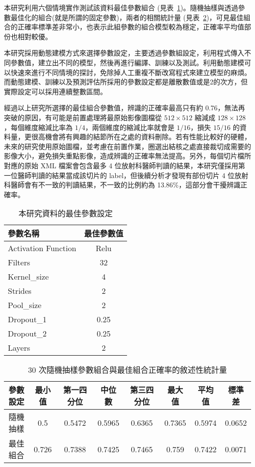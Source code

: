 \documentclass[12pt, a4paper]{article} 				%
\begin{document}
本研究利用六個情境實作測試該資料最佳參數組合 (見表~\ref{Table5-3})。隨機抽樣與透過參數最佳化的組合(就是所謂的固定參數)，兩者的相關統計量 (見表~\ref{Table5-4})，可見最佳組合的正確率標準差非常小，也表示此組參數的組合模型較為穩定，正確率平均值部份也相對較優。

本研究採用動態建模方式來選擇參數設定，主要透過參數組設定，利用程式傳入不同參數值，建立出不同的模型，然後再進行編譯、訓練以及測試。利用動態建模可以快速來進行不同情境的探討，免除掉人工重複不斷改寫程式來建立模型的麻煩。而動態建模、訓練以及預測評估所採用的參數設定都是離散數值或是2的次方，但實際設定可以採用連續整數區間。

經過以上研究所選擇的最佳組合參數值，辨識的正確率最高只有約 0.76，無法再突破的原因，有可能是前置處理將最原始影像圖檔從 $512\times 512$ 縮減成 $128\times 128$，每個維度縮減比率為 $1/4$，兩個維度的縮減比率就會是 $1/16$，損失 $15/16$ 的資料量，更很高機會將有興趣的結節所在之處的資料刪除。若有性能比較好的硬體，未來的研究使用原始圖檔，並考慮在前置作業，圈選出結核之處直接裁切成需要的影像大小，避免損失重點影像，造成辨識的正確率無法提高。另外，每個切片檔所對應的原始 XML 檔案會包含最多 4 位放射科醫師判讀的結果，本研究僅採用第一位醫師判讀的結果當成該切片的 label，但後續分析才發現有部份切片 4 位放射科醫師會有不一致的判讀結果，不一致的比例約為 13.86\%，這部分會干擾辨識正確率。

\begin{table}
\begin{center}
\caption{本研究資料的最佳參數設定}\label{Table5-3}
\begin{tabular}{lc}\toprule
參數名稱	&	最佳參數值	\\\midrule
Activation Function	&	Relu	\\
Filters	&	32	\\
Kernel\_size	&	4	\\
Strides	&	2	\\
Pool\_size	&	2	\\
Dropout\_1	&	0.25	\\
Dropout\_2	&	0.25	\\
Layers		& 2	\\\bottomrule
\end{tabular}
\end{center}
\end{table}

\begin{table}
\begin{center}
\caption{30 次隨機抽樣參數組合與最佳組合正確率的敘述性統計量}\label{Table5-4}
\begin{tabular}{cccccccc}\toprule
參數設定	&	最小值	&	第一四分位	&	中位數	&	第三四分位	&	最大值	&	平均值	&	標準差	\\\midrule
隨機抽樣	&	0.5	&	0.5472	&	0.5965	&	0.6365	&	0.7365	&	0.5974	&	0.0652	\\
最佳組合	&	0.726	&	0.7388	&	0.7425	&	0.7465	&	0.759	&	0.7422	&	0.0071	\\\bottomrule
\end{tabular}
\end{center}
\end{table}
\end{document}
